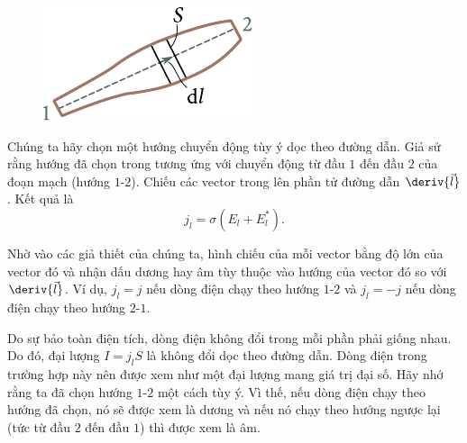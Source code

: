 \begin{figure}[!htb]
	\begin{center}
		\includegraphics[scale=1]{figures/ch_05/fig_5_6.pdf}
		\caption[]{}
		\label{fig:5_6}
	\end{center}
	\vspace{-0.8cm}
\end{figure}

Chúng ta hãy chọn một hướng chuyển động tùy ý dọc theo đường dẫn. Giả sử rằng hướng đã chọn trong  tương ứng với chuyển động từ đầu $1$ đến đầu $2$ của đoạn mạch (hướng $1$-$2$). Chiếu các vector trong  lên phần tử đường dẫn $\deriv{\vec{l}}$. Kết quả là
\begin{equation}\label{eq:5_26}
    j_l = \sigma (E_l + E_l^*).
\end{equation}

\noindent
Nhờ vào các giả thiết của chúng ta, hình chiếu của mỗi vector bằng độ lớn của vector đó và nhận dấu dương hay âm tùy thuộc vào hướng của vector đó so với $\deriv{\vec{l}}$. Ví dụ, $j_l=j$ nếu dòng điện chạy theo hướng $1$-$2$ và $j_l=-j$ nếu dòng điện chạy theo hướng $2$-$1$.

Do sự bảo toàn điện tích, dòng điện không đổi trong mỗi phần phải giống nhau. Do đó, đại lượng $I=j_lS$ là không đổi dọc theo đường dẫn. Dòng điện trong trường hợp này nên được xem như một đại lượng mang giá trị đại số. Hãy nhớ rằng ta đã chọn hướng $1$-$2$ một cách tùy ý. Vì thế, nếu dòng điện chạy theo hướng đã chọn, nó sẽ được xem là dương và nếu nó chạy theo hướng ngược lại (tức từ đầu $2$ đến đầu $1$) thì được xem là âm.


